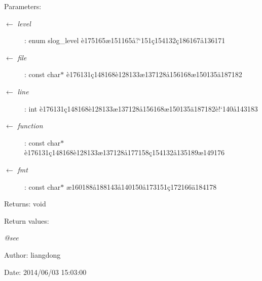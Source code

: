 \begin{Desc}
\item[Parameters:]
\begin{description}
\item[\mbox{$\leftarrow$} {\em level}]: enum slog\_\-level \`{e}175165\ae{}151165\aa{}?`151\c{c}154132\c{c}186167\aa{}136171 \item[\mbox{$\leftarrow$} {\em file}]: const char$\ast$ \`{e}176131\c{c}148168\`{e}128133\ae{}137128\aa{}156168\ae{}150135\"{a}187182 \item[\mbox{$\leftarrow$} {\em line}]: int \`{e}176131\c{c}148168\`{e}128133\ae{}137128\aa{}156168\ae{}150135\"{a}187182\`{e}!`140\aa{}143183 \item[\mbox{$\leftarrow$} {\em function}]: const char$\ast$ \`{e}176131\c{c}148168\`{e}128133\ae{}137128\aa{}177158\c{c}154132\aa{}135189\ae{}149176 \item[\mbox{$\leftarrow$} {\em fmt}]: const char$\ast$ \ae{}160188\aa{}188143\aa{}140150\aa{}173151\c{c}172166\"{a}184178 \end{description}
\end{Desc}
\begin{Desc}
\item[Returns:]void \end{Desc}
\begin{Desc}
\item[Return values:]
\begin{description}
\item[{\em @see}]\end{description}
\end{Desc}
\begin{Desc}
\item[Author:]liangdong \end{Desc}
\begin{Desc}
\item[Date:]2014/06/03 15:03:00 \end{Desc}
